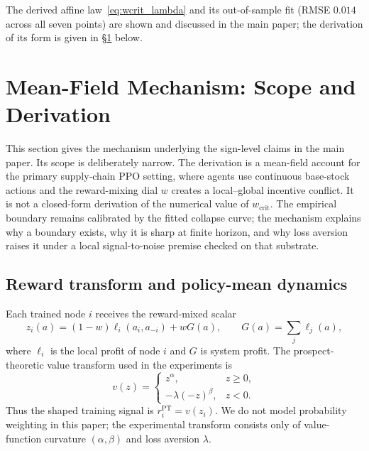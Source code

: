 \documentclass[letterpaper]{article} %
\theoremstyle{plain}
\newcommand{\wcrit}{w_{\mathrm{crit}}}
\begin{document}
\medskip\noindent The derived affine law~\eqref{eq:wcrit_lambda} and its out-of-sample fit
(RMSE $0.014$ across all seven points) are shown and discussed in the main paper; the
derivation of its form is given in \S\ref{sec:s_mechanism} below.

\section{Mean-Field Mechanism: Scope and Derivation}
\label{sec:s_mechanism}

This section gives the mechanism underlying the sign-level claims in the main paper. Its scope is
deliberately narrow. The derivation is a mean-field account for the primary supply-chain PPO
setting, where agents use continuous base-stock actions and the reward-mixing dial $w$ creates a
local--global incentive conflict. It is not a closed-form derivation of the numerical value of
$\wcrit$. The empirical boundary remains calibrated by the fitted collapse curve; the mechanism
explains why a boundary exists, why it is sharp at finite horizon, and why loss aversion raises it
under a local signal-to-noise premise checked on that substrate.

\subsection{Reward transform and policy-mean dynamics}
Each trained node $i$ receives the reward-mixed scalar
\begin{equation}
 z_i(a)=(1-w)\ell_i(a_i,a_{-i})+wG(a),\qquad G(a)=\sum_j \ell_j(a),
 \label{eq:blend}
\end{equation}
where $\ell_i$ is the local profit of node $i$ and $G$ is system profit. The prospect-theoretic
value transform used in the experiments is
\begin{equation}
 v(z)=
 \begin{cases}
 z^\alpha, & z\ge 0,\\
 -\lambda(-z)^\beta, & z<0.
 \end{cases}
\end{equation}
Thus the shaped training signal is $r_i^{\mathrm{PT}}=v(z_i)$. We do not model probability
weighting in this paper; the experimental transform consists only of value-function curvature
$(\alpha,\beta)$ and loss aversion $\lambda$.
\end{document}

